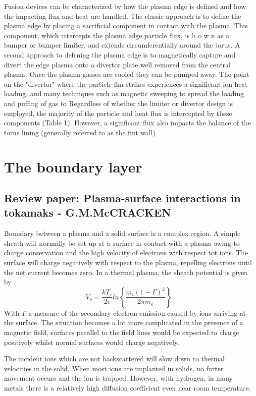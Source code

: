 Fusion devices can be characterized 
by how the plasma edge is defined and how 
the impacting flux and heat are handled. The classic approach is to define the 
plasma edge by placing a sacrificial 
component in contact with the plasma. This 
component, which intercepts the plasma edge particle flux, is h o w n  as a bumper 
or bumper limiter, and extends circumferentially around the torus. A second 
approach to defrning the plasma edge is to magnetically 
capture and divert the edge 
plasma onto a divertor plate well removed from the central plasma. Once the 
plasma gasses are cooled they can be pumped away. The point on the "divertor" 
where the particle flm strikes experiences 
a significant 
ion heat loadmg, and many 
techniques such as magnetic sweeping to spread the loading and puffing of gas to 
Regardless of whether the limiter or divertor design is employed, the majority of 
the particle and heat flux is intercepted 
by these components (Table 1). However, 
a sigmficant flux also impacts the balance of the torus lining (generally referred to 
as the fmt wall).
\section{The boundary layer}
\subsection{Review paper: Plasma-surface interactions in tokamaks - G.M.McCRACKEN}
Boundary between a plasma and a solid surface is a complex region. A simple sheath will
normally be set up at a surface in contact with a plasma owing to charge conservation
and the high velocity of electrons with respect tot ions.
The surface will charge negatively with respect to the plasma, repelling electrons 
until the net current becomes zero.
In a thermal plasma, the sheath potential is given by
\begin{equation}
    V_s = \frac{kT_e}{2e} ln\left\{\frac{m_i (1-\Gamma)^2}{2\pi m_e}\right\}
\end{equation}
With $\Gamma$ a measure of the secondary electron emission caused by ions arriving at the surface.
The situation becomes a lot more complicated in the presence of a magnetic field, surfaces parallel
to the field lines would be expected to charge positively whilst normal surfaces would charge negatively.

The incident ions which are not backscattered will slow down to thermal velocities in the solid. When most ions
are implanted in solids, no furter movement occurs and the ion is trapped.
However, with hydrogen, in many metals there is a relatively high diffusion coefficient even near room temperature.
